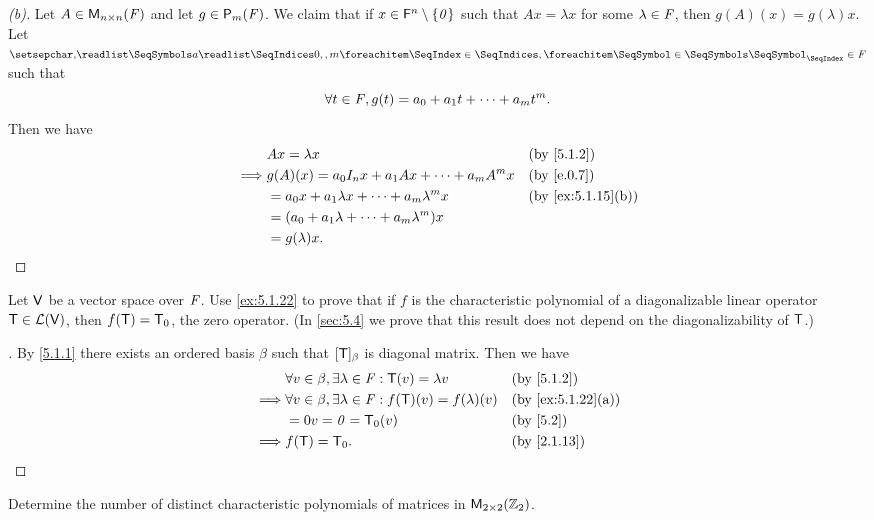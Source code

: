 \begin{proof}[(b)]
	Let \(A \in \mathsf{M}_{{n} \times n}({\mathit{F}})\) and let \(g \in \ps[m]{\F}\).
	We claim that if \(x \in \mathsf{F}^n \setminus \left\lbrace\mathit{0}\right\rbrace\) such that \(Ax = \lambda x\) for some \(\lambda \in \mathit{F}\), then \(g(A)(x) = g(\lambda) x\).
	Let \(\seq{a}{0,,m} \in \F\) such that
	\[
		\forall t \in \mathit{F}, g(t) = a_0 + a_1 t + \cdots + a_m t^m.
	\]
	Then we have
	\begin{align*}
		         & Ax = \lambda x                                     &  & \by{5.1.2}        \\
		\implies & g(A)(x) = a_0 I_n x + a_1 A x + \cdots + a_m A^m x &  & \by{e.0.7}        \\
		         & = a_0 x + a_1 \lambda x + \cdots + a_m \lambda^m x &  & \by{ex:5.1.15}[b] \\
		         & = (a_0 + a_1 \lambda + \cdots + a_m \lambda^m) x                          \\
		         & = g(\lambda) x.
	\end{align*}
\end{proof}

\begin{ex}\label{ex:5.1.23}
	Let \(\mathsf{V}\) be a vector space over \(\mathit{F}\).
	Use \cref{ex:5.1.22} to prove that if \(f\) is the characteristic polynomial of a diagonalizable linear operator \(\mathsf{T} \in \mathcal{L}(\mathsf{V})\), then \(f(\mathsf{T}) = \mathsf{T}_0\), the zero operator.
	(In \cref{sec:5.4} we prove that this result does not depend on the diagonalizability of \(\mathsf{T}\).)
\end{ex}

\begin{proof}[]
	By \cref{5.1.1} there exists an ordered basis \(\beta\) such that \([\mathsf{T}]_{\beta}\) is diagonal matrix.
	Then we have
	\begin{align*}
		         & \forall v \in \beta, \exists \lambda \in \F : \T(v) = \lambda v        &  & \by{5.1.2}        \\
		\implies & \forall v \in \beta, \exists \lambda \in \F : f(\T)(v) = f(\lambda)(v) &  & \by{ex:5.1.22}[a] \\
		         & = 0v = \zv = \zT(v)                                                    &  & \by{5.2}          \\
		\implies & f(\T) = \zT.                                                           &  & \by{2.1.13}
	\end{align*}
\end{proof}

\setcounter{ex}{25}
\begin{ex}\label{ex:5.1.26}
	Determine the number of distinct characteristic polynomials of matrices in \(\mathsf{M}_{{2} \times 2}({\mathbb{Z}_2})\).
\end{ex}

